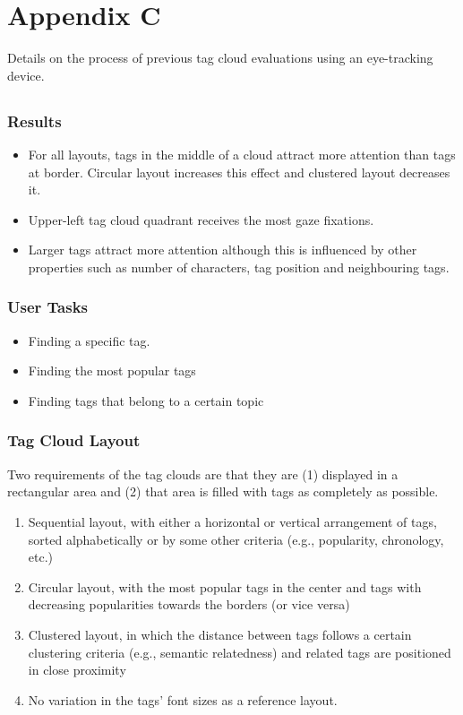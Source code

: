 \chapter{Appendix C}

Details on the process of previous tag cloud evaluations using an eye-tracking device.

\section{\cite{lohmann09}}

\subsection{Results}
\begin{itemize}
	\item For all layouts, tags in the middle of a cloud attract more attention than tags at border. Circular layout increases this effect and clustered layout decreases it.
	\item Upper-left tag cloud quadrant receives the most gaze fixations.
	\item Larger tags attract more attention although this is influenced by other properties such as number of characters, tag position and neighbouring tags.
\end{itemize}

\subsection{User Tasks}
\begin{itemize}
	\item Finding a specific tag.
	\item Finding the most popular tags
	\item Finding tags that belong to a certain topic
\end{itemize}

\subsection{Tag Cloud Layout}
Two requirements of the tag clouds are that they are (1) displayed in a rectangular area and (2) that area is filled with tags as completely as possible. 

\begin{enumerate}
	\item Sequential layout, with either a horizontal or vertical arrangement of tags, sorted
alphabetically or by some other criteria (e.g., popularity, chronology, etc.)
	\item Circular layout, with the most popular tags in the center and tags with decreasing
popularities towards the borders (or vice versa)
	\item Clustered layout, in which the distance between tags follows a certain clustering
criteria (e.g., semantic relatedness) and related tags are positioned in close
proximity 
	\item No variation in the tags’ font sizes as a reference layout.
\end{enumerate}

